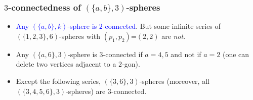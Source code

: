 \documentclass{beamer}
\begin{document}
\begin{frame}\frametitle{$3$-connectedness of $(\{a,b\},3)$-spheres}
\begin{itemize}
\item \textcolor{blue}{Any $(\{a,b\},k)$-sphere  is $2$-connected}.
But some infinite series of $(\{1,2,3\},6)$-spheres with 
$(p_1,p_2)$=$(2,2)$ are {\em not}.
\item Any $(\{a,6\},3)$-sphere is $3$-connected if $a=4,5$ and 
not if $a=2$ (one can delete two vertices 
adjacent to a $2$-gon). 

 \item Except   the following series,   $(\{3,6\},3)$-spheres (moreover,  
 all $(\{3,4,5,6\},3)$-spheres) are $3$-connected.



\end{itemize}

\begin{center}
\begin{minipage}[b]{30mm}
\centering
{}\par
\end{minipage}
\begin{minipage}[b]{30mm}
\centering
{}\par
\end{minipage}
\begin{minipage}[b]{30mm}
\centering
{}\par
\end{minipage}
\end{center}


\end{frame}
\end{document}
